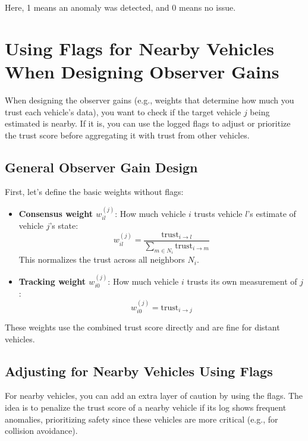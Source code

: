 \documentclass{article}
\begin{document}
Here, 1 means an anomaly was detected, and 0 means no issue.

\section{Using Flags for Nearby Vehicles When Designing Observer Gains}
When designing the observer gains (e.g., weights that determine how much you trust each vehicle's data), you want to check if the target vehicle \( j \) being estimated is nearby. If it is, you can use the logged flags to adjust or prioritize the trust score before aggregating it with trust from other vehicles.

\subsection{General Observer Gain Design}
First, let's define the basic weights without flags:
\begin{itemize}
    \item \textbf{Consensus weight \( w_{il}^{(j)} \)}: How much vehicle \( i \) trusts vehicle \( l \)'s estimate of vehicle \( j \)'s state:
    \[
    w_{il}^{(j)} = \frac{\text{trust}_{i \to l}}{\sum_{m \in N_i} \text{trust}_{i \to m}}
    \]
    This normalizes the trust across all neighbors \( N_i \).
    
    \item \textbf{Tracking weight \( w_{i0}^{(j)} \)}: How much vehicle \( i \) trusts its own measurement of \( j \):
    \[
    w_{i0}^{(j)} = \text{trust}_{i \to j}
    \]
\end{itemize}

These weights use the combined trust score directly and are fine for distant vehicles.

\subsection{Adjusting for Nearby Vehicles Using Flags}
For nearby vehicles, you can add an extra layer of caution by using the flags. The idea is to penalize the trust score of a nearby vehicle if its log shows frequent anomalies, prioritizing safety since these vehicles are more critical (e.g., for collision avoidance).
\end{document}
